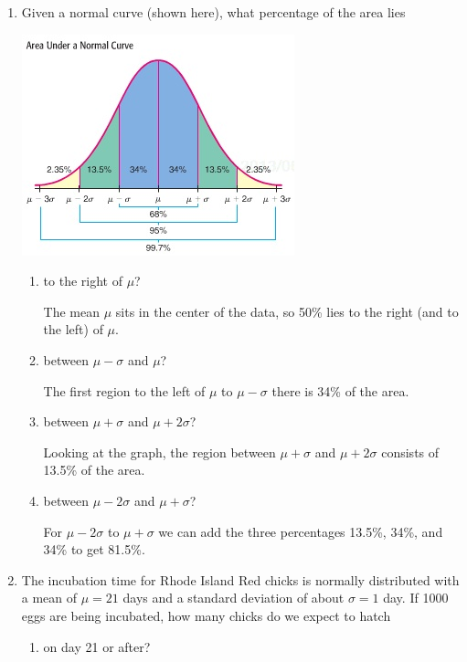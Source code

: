 \documentclass{article}
\newcommand{\answer}[1]{\color{white}#1}
\begin{document}
\pagestyle{myheadings}

\begin{enumerate}

\item Given a normal curve (shown here),  what percentage of the area lies 

\begin{center}
\includegraphics[scale=0.6]{WS10_NormalArea.jpg}
\end{center}

	\begin{enumerate}
	\item to the right of $\mu$? 
	
	{\answer The mean $\mu$ sits in the center of the data, so 50\% lies to the right (and to the left) of $\mu$.}
	
	\item between $\mu - \sigma$ and $\mu$? 
	
	{\answer The first region to the left of $\mu$ to $\mu-\sigma$ there is 34\% of the area.}
	
	\item between $\mu + \sigma$ and $\mu + 2\sigma$? 
	
	{\answer Looking at the graph, the region between $\mu + \sigma$ and $\mu +2\sigma$ consists of 13.5\% of the area.}
	
	\item between $\mu-2\sigma$ and $\mu + \sigma$? 
	
	{\answer For $\mu-2\sigma$ to $\mu + \sigma$ we can add the three percentages 13.5\%, 34\%, and 34\% to get 81.5\%.}
	
	\end{enumerate}
	
\item The incubation time for Rhode Island Red chicks is normally distributed with a mean of $\mu = 21$ days and a standard deviation of about $\sigma =1$ day.  If 1000 eggs are being incubated, how many chicks do we expect to hatch
	\begin{enumerate}
	\item on day 21 or after?
	

\end{enumerate}
\end{enumerate}
\end{document}
